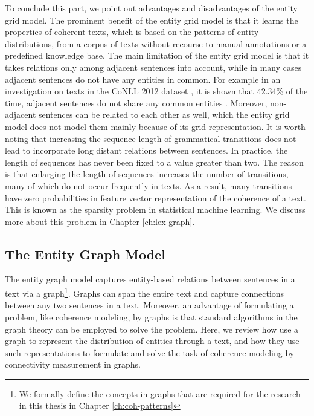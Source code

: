 To conclude this part, we point out advantages and disadvantages of the entity grid model. 
The prominent benefit of the entity grid model is that it learns the properties of coherent texts, which is based on the patterns of entity distributions, from a corpus of texts without recourse to manual annotations or a predefined knowledge base.
The main limitation of the entity grid model is that it takes relations only among adjacent sentences into account, while in many cases adjacent sentences do not have any entities in common. 
For example in an investigation on texts in the CoNLL 2012 dataset \cite{pradhan12}, it is shown that 42.34\% of the time, adjacent sentences do not share any common entities \cite{zhangmuyu15}. 
Moreover, non-adjacent sentences can be related to each other as well, which the entity grid model does not model them mainly because of its grid representation. 
It is worth noting that increasing the sequence length of grammatical transitions  does not lead to incorporate long distant relations between sentences.  
In practice, the length of sequences has never been fixed to a value greater than two. 
The reason is that enlarging the length of sequences increases the number of transitions, many of which do not occur frequently in texts. 
As a result, many transitions have zero probabilities in feature vector representation of the coherence of a text. 
This is known as the sparsity problem in statistical machine learning. 
We discuss more about this problem in Chapter \ref{ch:lex-graph}. 

\subsection{The Entity Graph Model}
\label{sec:ent_graph}

The entity graph model \cite{guinaudeau13} captures entity-based relations between sentences in a text via a graph\footnote{We formally define the concepts in graphs that are required for the research in this thesis in Chapter \ref{ch:coh-patterns}}. 
Graphs can span the entire text and capture connections between any two sentences in a text. 
Moreover, an advantage of formulating a problem, like coherence modeling, by graphs is that standard algorithms in the graph theory can be employed to solve the problem. 
Here, we review how  use a graph to represent the distribution of entities through a text, and how they use such representations to formulate and solve the task of coherence modeling by connectivity measurement in graphs.  

